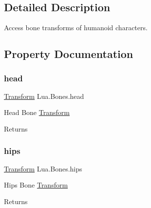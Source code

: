 \subsection{Detailed Description}
Access bone transforms of humanoid characters. 



\subsection{Property Documentation}
\mbox{\label{class_lua_1_1_bones_a6ee9efaf692471552da3f885987361ca}} 
\subsubsection{\texorpdfstring{head}{head}}
{\footnotesize\ttfamily \mbox{\hyperlink{class_lua_1_1_transform}{Transform}} Lua.\+Bones.\+head\hspace{0.3cm}{\ttfamily [get]}}



Head Bone \mbox{\hyperlink{class_lua_1_1_transform}{Transform}} 

\begin{DoxyReturn}{Returns}

\end{DoxyReturn}
\mbox{\label{class_lua_1_1_bones_aaf90bd7cb3fbd050f890e985d7a8a160}} 
\subsubsection{\texorpdfstring{hips}{hips}}
{\footnotesize\ttfamily \mbox{\hyperlink{class_lua_1_1_transform}{Transform}} Lua.\+Bones.\+hips\hspace{0.3cm}{\ttfamily [get]}}



Hips Bone \mbox{\hyperlink{class_lua_1_1_transform}{Transform}} 

\begin{DoxyReturn}{Returns}

\end{DoxyReturn}
\mbox{\label{class_lua_1_1_bones_a6ee2d4c0e55ea06ca64e086680d87331}} 
